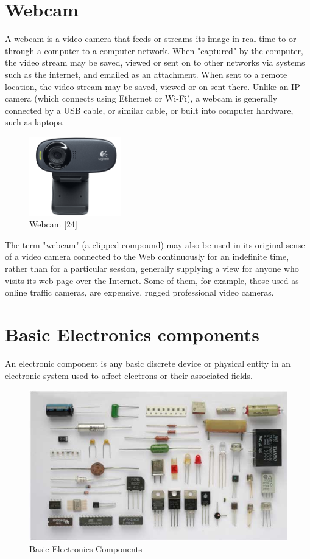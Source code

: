 \documentclass[twoside,a4paper,16pt]{book}
\begin{document}
{{			
			
			\section{Webcam }
			A webcam is a video camera that feeds or streams its image in real time to or through a computer to a computer network. When "captured" by the computer, the video stream may be saved, viewed or sent on to other networks via systems such as the internet, and emailed as an attachment. When sent to a remote location, the video stream may be saved, viewed or on sent there. Unlike an IP camera (which connects using Ethernet or Wi-Fi), a webcam is generally connected by a USB cable, or similar cable, or built into computer hardware, such as laptops.
			\begin{figure}[ht!]
				\begin{center}
					\includegraphics[width=4.0cm]{19.png}
					\caption{Webcam [24]}
				\end{center}
			\end{figure}
			
			The term "webcam" (a clipped compound) may also be used in its original sense of a video camera connected to the Web continuously for an indefinite time, rather than for a particular session, generally supplying a view for anyone who visits its web page over the Internet. Some of them, for example, those used as online traffic cameras, are expensive, rugged professional video cameras.
			
			\section{Basic Electronics components }
			An electronic component is any basic discrete device or physical entity in an electronic system used to affect electrons or their associated fields.
			\begin{figure}[ht!]
				\begin{center}
					\includegraphics[width=12.0cm]{20.jpg}
					\caption{Basic Electronics Components}
				\end{center}
			\end{figure}
}}
\end{document}
